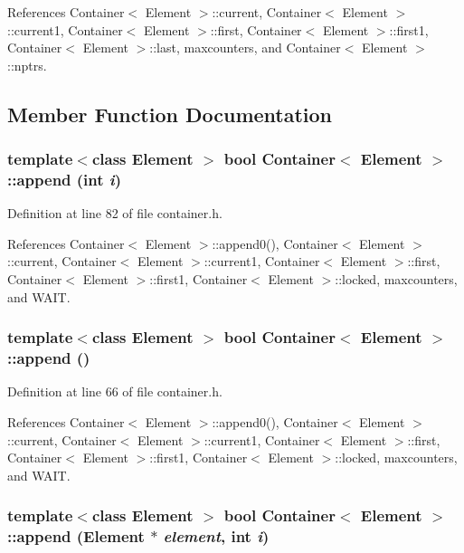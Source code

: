 References Container$<$ Element $>$::current, Container$<$ Element $>$::current1, Container$<$ Element $>$::first, Container$<$ Element $>$::first1, Container$<$ Element $>$::last, maxcounters, and Container$<$ Element $>$::nptrs.

\subsection{Member Function Documentation}
\hypertarget{classContainer_80d4d69e2a81773e6d16ced140024034}{
\subsubsection[{append}]{\setlength{\rightskip}{0pt plus 5cm}template$<$class Element $>$ bool {\bf Container}$<$ Element $>$::append (int {\em i})}}
\label{classContainer_80d4d69e2a81773e6d16ced140024034}




Definition at line 82 of file container.h.

References Container$<$ Element $>$::append0(), Container$<$ Element $>$::current, Container$<$ Element $>$::current1, Container$<$ Element $>$::first, Container$<$ Element $>$::first1, Container$<$ Element $>$::locked, maxcounters, and WAIT.\hypertarget{classContainer_f6580811189fb90f8a2274e4af959490}{
\subsubsection[{append}]{\setlength{\rightskip}{0pt plus 5cm}template$<$class Element $>$ bool {\bf Container}$<$ Element $>$::append ()}}
\label{classContainer_f6580811189fb90f8a2274e4af959490}




Definition at line 66 of file container.h.

References Container$<$ Element $>$::append0(), Container$<$ Element $>$::current, Container$<$ Element $>$::current1, Container$<$ Element $>$::first, Container$<$ Element $>$::first1, Container$<$ Element $>$::locked, maxcounters, and WAIT.\hypertarget{classContainer_b49fa562de9858f890a373d811bd0813}{
\subsubsection[{append}]{\setlength{\rightskip}{0pt plus 5cm}template$<$class Element $>$ bool {\bf Container}$<$ Element $>$::append (Element $\ast$ {\em element}, \/  int {\em i})}}
\label{classContainer_b49fa562de9858f890a373d811bd0813}




